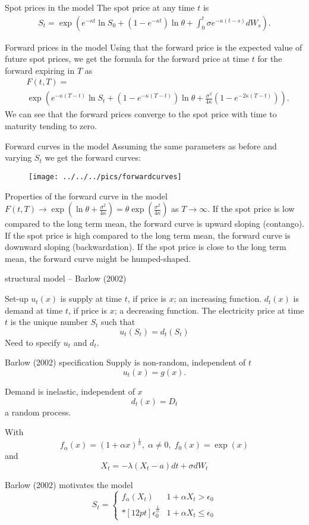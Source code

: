 Spot prices in the model 
	The spot price at any time $t$ is 
		\begin{align*}
		S_{t}=\exp\left(e^{-\kappa t}\ln S_{0}+(1-e^{-\kappa t})\ln\theta+\int_{0}^{t}{\sigma e^{-\kappa(t-s)}}dW_{s}\right).
		\end{align*}


Forward prices in the model 
	Using that the forward price is the expected value of future spot prices, %
	we get the formula for the forward price at time $t$ for the forward expiring in $T$ as 
		\begin{align*}
			& F(t,T)=\\
			& \exp\left(e^{-\kappa(T-t)}\ln S_{t}+(1-e^{-\kappa(T-t)})\ln\theta+\frac{\sigma^{2}}{4\kappa}(1-e^{-2\kappa(T-t)})\right).
		\end{align*}
	We can see that the forward prices converge to the spot price with time to maturity tending to zero. 


Forward curves in the model 
	Assuming the same parameters as before and varying $S_{t}$ we get the forward curves: 
		\begin{figure}
			\centering
				\texttt{[image: ../../../pics/forwardcurves]}
			\label{fig:forwardcurves}
		\end{figure}


Properties of the forward curve in the model 
	$F(t,T)\rightarrow\exp(\ln\theta+\frac{\sigma^{2}}{4\kappa})=\theta\exp{(\frac{\sigma^{2}}{4\kappa})}$ as $T\rightarrow\infty$. 
	If the spot price is low compared to the long term mean, the forward curve is upward sloping (contango). 
	If the spot price is high compared to the long term mean, the forward curve is downward sloping (backwardation). 
	If the spot price is close to the long term mean, the forward curve might be humped-shaped. 


\subsectionA structural model -- Barlow (2002)

Set-up 
	$u_{t}(x)$ is supply at time $t$, if price is $x$; an increasing function. 
	$d_{t}(x)$ is demand at time $t$, if price is $x$; a decreasing function. 
	The electricity price at time $t$ is the unique number $S_{t}$ such that 
		$$
		u_{t}(S_{t})=d_{t}(S_{t})
		$$
	Need to specify $u_{t}$ and $d_{t}$. 

 
Barlow (2002) specification 
	Supply is non-random, independent of $t$ 
		$$
		u_{t}(x)=g(x).
		$$
		
	Demand is inelastic, independent of $x$ 
		$$
		d_{t}(x)=D_{t}
		$$
		a random process. 

	With 
		$$
		f_{\alpha}(x)=(1+\alpha x)^{\frac{1}{\alpha}},\;\alpha\not=0,\; f_{0}(x)=\exp(x)
		$$
		and 
		$$
		X_{t}=-\lambda(X_{t}-a)dt+\sigma dW_{t}
		$$
		
	Barlow (2002) motivates the model 
		$$
			S_{t}=\left\{ \begin{array}{ll}
			{\displaystyle 
			f_{\alpha}(X_{t})} & 1+\alpha X_{t}>\epsilon_{0}\\* {}[12pt]
			\epsilon_{0}^{\frac{1}{\alpha}} & 1+\alpha X_{t}\leq\epsilon_{0}
			\end{array}
			\right.
		$$




